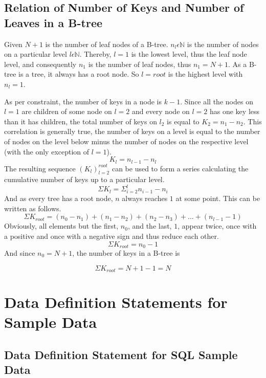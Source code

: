 \section{Relation of Number of Keys and Number of Leaves in a B-tree} \label{apx:Relation of Number of Keys and Number of Leaves in a B-tree}
Given $N+1$ is the number of leaf nodes of a B-tree. $n_{l} \epsilon  \mathbb{N}$ is the number of nodes on a particular level $l \epsilon \mathbb{N}$. Thereby, $l = 1$ is the lowest level, thus the leaf node level, and consequently $n_{1}$ is the number of leaf nodes, thus $n_{1} = N+1$. As a B-tree is a tree, it always has a root node. So $l = root$ is the highest level with $n_{l} = 1$.\par
As per constraint, the number of keys in a node is $k-1$. Since all the nodes on $l = 1$ are children of some node on $l = 2$ and every node on $l = 2$ has one key less than it has children, the total number of keys on $l_{2}$ is equal to $K_{2} = n_{1} - n_{2}$. This correlation is generally true, the number of keys on a level is equal to the number of nodes on the level below minus the number of nodes on the respective level (with the only exception of $l = 1$).
$$ K_{l} = n_{l-1} - n_{l} $$
The resulting sequence $(K_l)_{l=2}^{root}$ can be used to form a series calculating the cumulative number of keys up to a particular level.
$$\Sigma K_l = \Sigma_{i=2}^{l} n_{i-1} - n_{i} $$
And as every tree has a root node, $n$ always reaches $1$ at some point. This can be written as follows.
$$\Sigma K_{root} = (n_0 - n_1) + (n_1 - n_2) + (n_2 - n_3) + ... + (n_{l-1} - 1) $$
Obviously, all elements but the first, $n_0$, and the last, $1$, appear twice, once with a positive and once with a negative sign and thus reduce each other.
$$\Sigma K_{root} = n_0 - 1$$
And since $n_0 = N + 1$, the number of keys in a B-tree is

$$\Sigma K_{root} = N + 1 - 1 = N$$

\chapter{Data Definition Statements for Sample Data}
\section{Data Definition Statement for SQL Sample Data} \label{apx:Data Definition Statement for SQL Sample Data}

